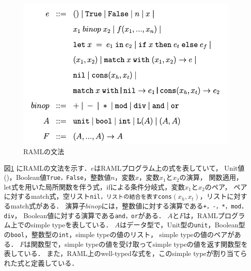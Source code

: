 \documentclass{kuisthesis}
\begin{document}
\begin{figure}[ht]
  \begin{center}
    \includegraphics[scale=0.8]{image2.png}
    \caption{RAMLの文法}
    \label{image2}
  \end{center}
\end{figure}

図\ref{image2} にRAMLの文法を示す．$e$はRAMLプログラム上の式を表していて，
Unit値()，Boolean値{\tt True，False}，整数値$n$，変数$x$，変数$x_1$と$x_2$の演算，
関数適用，let式を用いた局所関数を伴う式，ifによる条件分岐式，変数$x_1$と$x_2$のペア，
ペアに対するmatch式，空リスト{\tt nil，リストの結合を表すcons}$(x_h,x_t)$，リストに対するmatch式がある．
演算子$binop$には，整数値に対する演算である{\tt +，-，*，mod，div}，
Boolean値に対する演算である{\tt and，or}がある．
$A$と$F$は，RAMLプログラム上でのsimple typeを表している．
$A$はデータ型で，Unit型の{\tt unit}，Boolean型の{\tt bool}，整数型の{\tt int}，simple typeの値のリスト，
simple typeの値のペアがある．
$F$は関数型で，simple typeの値を受け取ってsimple typeの値を返す関数型を表している．
また，RAML上のwell-typedな式を，このsimple typeが割り当てられた式と定義している．
\end{document}

